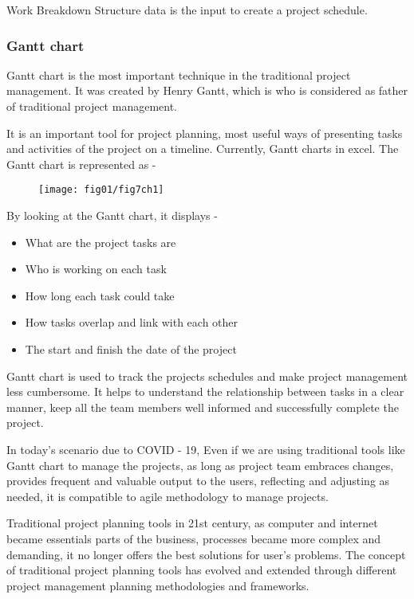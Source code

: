 Work Breakdown Structure data is the input to create a project schedule.

\subsubsection{Gantt chart} 

Gantt chart is the most important technique in the traditional project management. It was created by Henry Gantt, which is who is considered as father of traditional project management.

It is an important tool for project planning, most useful ways of presenting tasks and activities of the project on a timeline. Currently, Gantt charts in excel. The Gantt chart is represented as -
 
\begin{figure}
	\centering
	\texttt{[image: fig01/fig7ch1]}
\end{figure}
 
 
By looking at the Gantt chart, it displays - 

\begin{itemize}
    \item What are the project tasks are 
    \item Who is working on each task 
    \item How long each task could take 
    \item How tasks overlap and link with each other 
    \item The start and finish the date of the project
\end{itemize}

Gantt chart is used to track the projects schedules and make project management less cumbersome. It helps to understand the relationship between tasks in a clear manner, keep all the team members well informed and successfully complete the project.

In today's scenario due to COVID - 19, Even if we are using traditional tools like Gantt chart to manage the projects, as long as project team embraces changes, provides frequent and valuable output to the users, reflecting and adjusting as needed, it is compatible to agile methodology to manage projects. 

Traditional project planning tools in 21st century, as computer and internet became essentials parts of the business, processes became more complex and demanding, it no longer offers the best solutions for user's problems. The concept of traditional project planning tools has evolved and extended through different project management planning methodologies and frameworks.

